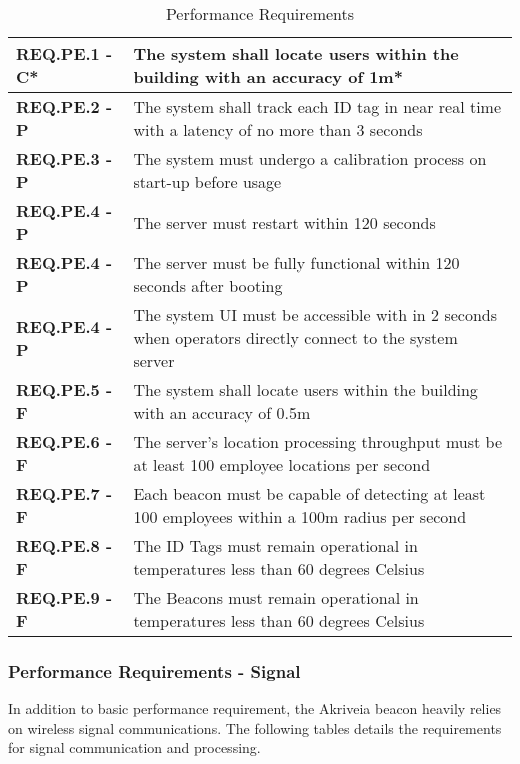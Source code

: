 \bigskip
\bgroup
\def\arraystretch{1.5}
\begin{table}[H]
\centering
\begin{tabular}{ | m{3.5cm} | m{12.5cm} |}
 \hline
 \textbf{REQ.PE.1 - C*} & The system shall locate users within the building with an accuracy of 1m* \\
\hline
 \textbf{REQ.PE.2 - P} & The system shall track each ID tag in near real time with a latency of no more than 3 seconds \\
\hline
 \textbf{REQ.PE.3 - P} & The system must undergo a calibration process on start-up before usage \\
\hline
 \textbf{REQ.PE.4 - P} & The server must restart within 120 seconds \\
\hline
 \textbf{REQ.PE.4 - P} & The server must be fully functional within 120 seconds after booting \\
\hline
 \textbf{REQ.PE.4 - P} & The system UI must be accessible with in 2 seconds when operators directly connect to the system server \\
\hline
 \textbf{REQ.PE.5 - F} & The system shall locate users within the building with an accuracy of 0.5m \\
\hline
 \textbf{REQ.PE.6 - F} & The server's location processing throughput must be at least 100 employee locations per second \\
\hline
 \textbf{REQ.PE.7 - F} & Each beacon must be capable of detecting at least 100 employees within a 100m radius per second \\
\hline
 \textbf{REQ.PE.8 - F} & The ID Tags must remain operational in temperatures less than 60 degrees Celsius \\
\hline
 \textbf{REQ.PE.9 - F} & The Beacons must remain operational in temperatures less than 60 degrees Celsius \\
\hline
\end{tabular}
\caption{Performance Requirements}
\end{table}

\break

\subsubsection{Performance Requirements - Signal}
In addition to basic performance requirement, the Akriveia beacon heavily relies on wireless signal communications. The following tables details the requirements for signal communication and processing.
\bigskip

